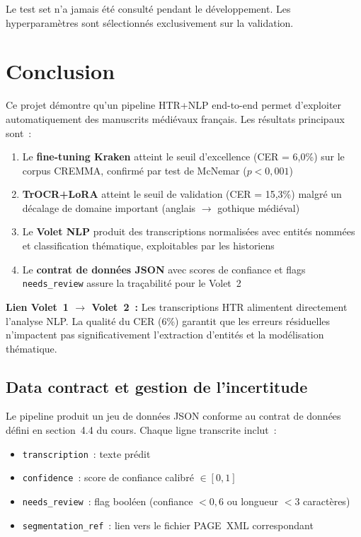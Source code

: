 \documentclass[11pt,a4paper]{article}
\begin{document}
\noindent Le test set n'a jamais été consulté pendant le développement. Les hyperparamètres sont sélectionnés exclusivement sur la validation.

\section{Conclusion}

Ce projet démontre qu'un pipeline HTR+NLP end-to-end permet d'exploiter automatiquement des manuscrits médiévaux français. Les résultats principaux sont~:

\begin{enumerate}[leftmargin=*, itemsep=2pt]
\item Le \textbf{fine-tuning Kraken} atteint le seuil d'excellence (CER = 6,0\%) sur le corpus CREMMA, confirmé par test de McNemar ($p < 0,001$)
\item \textbf{TrOCR+LoRA} atteint le seuil de validation (CER = 15,3\%) malgré un décalage de domaine important (anglais $\rightarrow$ gothique médiéval)
\item Le \textbf{Volet NLP} produit des transcriptions normalisées avec entités nommées et classification thématique, exploitables par les historiens
\item Le \textbf{contrat de données JSON} avec scores de confiance et flags \texttt{needs\_review} assure la traçabilité pour le Volet~2
\end{enumerate}

\textbf{Lien Volet~1 $\rightarrow$ Volet~2~:} Les transcriptions HTR alimentent directement l'analyse NLP. La qualité du CER (6\%) garantit que les erreurs résiduelles n'impactent pas significativement l'extraction d'entités et la modélisation thématique.

\subsection{Data contract et gestion de l'incertitude}

Le pipeline produit un jeu de données JSON conforme au contrat de données défini en section~4.4 du cours. Chaque ligne transcrite inclut~:
\begin{itemize}[leftmargin=*, itemsep=1pt]
\item \texttt{transcription}~: texte prédit
\item \texttt{confidence}~: score de confiance calibré $\in [0,1]$
\item \texttt{needs\_review}~: flag booléen (confiance $< 0,6$ ou longueur $< 3$ caractères)
\item \texttt{segmentation\_ref}~: lien vers le fichier PAGE~XML correspondant
\end{itemize}
\end{document}
